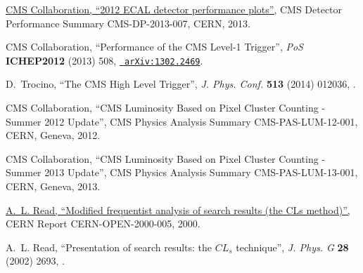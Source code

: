 \documentclass[12pt]{thesis}  %
\begin{document}
\begin{thebibliography}{10}
\href {https://cds.cern.ch/record/1528235} {{ CMS} Collaboration, ``{2012 ECAL
  detector performance plots}'',} CMS Detector Performance Summary
  CMS-DP-2013-007, CERN, 2013.

\hrefCMSnoop {} {{ CMS} Collaboration, ``{Performance of the CMS Level-1
  Trigger}'',} \textit{ PoS} \textbf{ ICHEP2012} (2013) 508,
\href{http://www.arXiv.org/abs/1302.2469}{\texttt{ arXiv:1302.2469}}.

\hrefCMSnoop {} {D.~Trocino, ``{The CMS High Level Trigger}'',} \textit{ J.
  Phys. Conf.} \textbf{ 513} (2014) 012036,
\href{http://dx.doi.org/10.1088/1742-6596/513/1/012036}{}.

\hrefCMSnoop {} {{ CMS} Collaboration, ``{CMS Luminosity Based on Pixel Cluster
  Counting - Summer 2012 Update}'',} CMS Physics Analysis Summary
  CMS-PAS-LUM-12-001, CERN, Geneva, 2012.

\hrefCMSnoop {} {{ CMS} Collaboration, ``{CMS Luminosity Based on Pixel Cluster
  Counting - Summer 2013 Update}'',} CMS Physics Analysis Summary
  CMS-PAS-LUM-13-001, CERN, Geneva, 2013.

\href {http://cdsweb.cern.ch/record/451614} {A.~L. Read, ``Modified frequentist
  analysis of search results (the CLs method)'',} {CERN} Report
  CERN-OPEN-2000-005, 2000.

\hrefCMSnoop {} {A.~L. Read, ``{Presentation of search results: the $CL_{s}$
  technique}'',} \textit{ J. Phys. G} \textbf{ 28} (2002) 2693,
  \href{http://dx.doi.org/10.1088/0954-3899/28/10/313}{}.

\end{thebibliography}\endgroup
\end{document}
